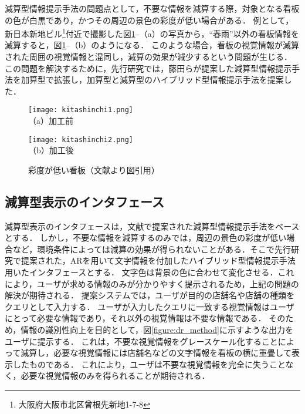   減算型情報提示手法の問題点として，不要な情報を減算する際，対象となる看板の色が白黒であり，かつその周辺の景色の彩度が低い場合がある．
  例として，新日本新地ビル\footnote{大阪府大阪市北区曾根先新地1-7-8}付近で撮影した図\ref{figure:kitashinchi}--（a）の写真から，``春雨''以外の看板情報を減算すると，図\ref{figure:kitashinchi}--（b）のようになる．
  このような場合，看板の視覚情報が減算された周囲の視覚情報と混同し，減算の効果が減少するという問題が生じる．
  この問題を解決するために，先行研究\cite{Kitamura:2017a, Kitamura:2017b}では，藤田らが提案した減算型情報提示手法を加算型で拡張し，加算型と減算型のハイブリッド型情報提示手法を提案した．

  \begin{figure}[t]
    \begin{minipage}{0.49\hsize}
        \begin{center}
          \texttt{[image: kitashinchi1.png]}\\
          \small{（a）加工前}
        \end{center}
    \end{minipage}
    \begin{minipage}{0.49\hsize}
        \begin{center}
          \texttt{[image: kitashinchi2.png]}\\
          \small{（b）加工後}
        \end{center}
    \end{minipage}
    \vspace{2pt}
    \caption{彩度が低い看板（文献\cite{Kitamura:2017a}より図引用）}
    \label{figure:kitashinchi}
  \end{figure}


  \subsection{減算型表示のインタフェース}
    減算型表示のインタフェースは，文献\cite{Fujita:2013}で提案された減算型情報提示手法をベースとする．
    しかし，不要な情報を減算するのみでは，周辺の景色の彩度が低い場合など，環境条件によっては減算の効果が得られないことがある．そこで先行研究\cite{Kitamura:2017a, Kitamura:2017b}で提案された，ARを用いて文字情報を付加したハイブリッド型情報提示手法用いたインタフェースとする．
    文字色は背景の色に合わせて変化させる．これにより，ユーザが求める情報のみが分かりやすく提示されるため，上記の問題の解決が期待される．
    提案システムでは，ユーザが目的の店舗名や店舗の種類をクエリとして入力する．
    ユーザが入力したクエリに一致する視覚情報はユーザにとって必要な情報であり，それ以外の視覚情報は不要な情報である．
    そのため，情報の識別性向上を目的として，図\ref{figure:dr_method}に示すような出力をユーザに提示する．
    これは，不要な視覚情報をグレースケール化することによって減算し，必要な視覚情報には店舗名などの文字情報を看板の横に重畳して表示したものである．
    これにより，ユーザは不要な視覚情報を完全に失うことなく，必要な視覚情報のみを得られることが期待される．

